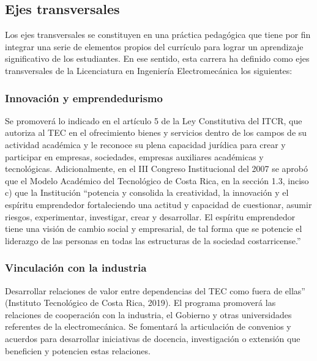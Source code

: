 \subsection*{Ejes transversales}

Los ejes transversales se constituyen en una práctica pedagógica que tiene por fin integrar una serie de elementos propios del currículo para lograr un aprendizaje significativo de los estudiantes. En ese sentido, esta carrera ha definido como ejes transversales de la Licenciatura en Ingeniería Electromecánica los siguientes:\par

\subsubsection*{Innovación y emprendedurismo}

Se promoverá lo indicado en el artículo 5 de la Ley Constitutiva del ITCR, que autoriza al TEC en el ofrecimiento bienes y servicios dentro de los campos de su actividad académica y le reconoce su plena capacidad jurídica para crear y participar en empresas, sociedades, empresas auxiliares académicas y tecnológicas. Adicionalmente, en el III Congreso Institucional del 2007 se aprobó que el Modelo Académico del Tecnológico de Costa Rica, en la sección 1.3, inciso c) que la Institución “potencia y consolida la creatividad, la innovación y el espíritu emprendedor fortaleciendo una actitud y capacidad de cuestionar, asumir riesgos, experimentar, investigar, crear y desarrollar. El espíritu emprendedor tiene una visión de cambio social y empresarial, de tal forma que se potencie el liderazgo de las personas en todas las estructuras de la sociedad costarricense.”\par

\subsubsection*{Vinculación con la industria}

Desarrollar relaciones de valor entre dependencias del TEC como fuera de ellas” (Instituto Tecnológico de Costa Rica, 2019). El programa promoverá las relaciones de cooperación con la industria, el Gobierno y otras universidades referentes de la electromecánica. Se fomentará la articulación de convenios y acuerdos para desarrollar iniciativas de docencia, investigación o extensión que beneficien y potencien estas relaciones.\par

